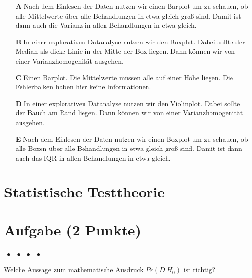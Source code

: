 \documentclass[a4paper, 9pt]{scrartcl}\usepackage[]{graphicx}\usepackage[]{xcolor}
\begin{document}
\begin{enumerate}
\item [\textbf{A} \msquare] Nach dem Einlesen der Daten nutzen wir einen Barplot um zu schauen, ob alle Mittelwerte über alle Behandlungen in etwa gleich groß sind. Damit ist dann auch die Varianz in allen Behandlungen in etwa gleich.
\item [\textbf{B} \msquare] In einer explorativen Datanalyse nutzen wir den Boxplot. Dabei sollte der Median als dicke Linie in der Mitte der Box liegen. Dann können wir von einer Varianzhomogenität ausgehen.
\item [\textbf{C} \msquare] Einen Barplot. Die Mittelwerte müssen alle auf einer Höhe liegen. Die Fehlerbalken haben hier keine Informationen.
\item [\textbf{D} \msquare] In einer explorativen Datanalyse nutzen wir den Violinplot. Dabei sollte der Bauch am Rand liegen. Dann können wir von einer Varianzhomogenität ausgehen.
\item [\textbf{E} \msquare] Nach dem Einlesen der Daten nutzen wir einen Boxplot um zu schauen, ob alle Boxen über alle Behandlungen in etwa gleich groß sind. Damit ist dann auch das IQR in allen Behandlungen in etwa gleich.
\end{enumerate}
\section*{Statistische Testtheorie}  

\section{Aufgabe \hfill (2 Punkte)}

\ifcollection
\begin{flushright}
\tiny\vspace{-2Ex}
\textbf{\examinhaltstart}
\exammodulemathstat $\;\bullet$
\exammodulestat $\;\bullet$
\exammodulestatbbv $\;\bullet$
\exammodulestatversuch $\;\bullet$
\exammodulebiostat
\vspace{-1Ex}
\end{flushright}
\fi




Welche Aussage zum mathematische Ausdruck $Pr(D|H_0)$ ist richtig?
\end{document}
